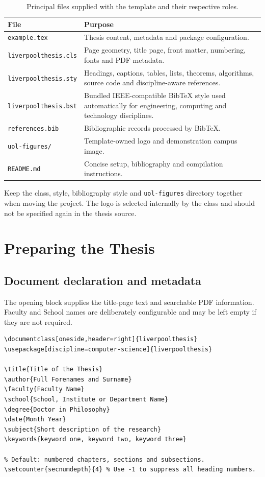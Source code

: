 \documentclass[oneside,header=auto]{liverpoolthesis}
\begin{document}
\begin{table}[htbp]
  \centering
  \caption[Principal template files]{Principal files supplied with the template and their respective roles.}
  \label{tab:files}
  \begin{tabular}{p{}p{}}
    \toprule
    \textbf{File} & \textbf{Purpose} \\
    \midrule
    \texttt{example.tex} & Thesis content, metadata and package configuration. \\
    \texttt{liverpoolthesis.cls} & Page geometry, title page, front matter,
      numbering, fonts and PDF metadata. \\
    \texttt{liverpoolthesis.sty} & Headings, captions, tables, lists,
      theorems, algorithms, source code and discipline-aware references. \\
    \texttt{liverpoolthesis.bst} & Bundled IEEE-compatible BibTeX style used
      automatically for engineering, computing and technology disciplines. \\
    \texttt{references.bib} & Bibliographic records processed by BibTeX. \\
    \texttt{uol-figures/} & Template-owned logo and demonstration campus image. \\
    \texttt{README.md} & Concise setup, bibliography and compilation instructions. \\
    \bottomrule
  \end{tabular}
\end{table}

Keep the class, style, bibliography style and \texttt{uol-figures} directory together when moving the project. The logo is selected internally by the class and should not be specified again in the thesis source.

\chapter{Preparing the Thesis}

\section{Document declaration and metadata}

The opening block supplies the title-page text and searchable PDF information. Faculty and School names are deliberately configurable and may be left empty if they are not required.

\begin{lstlisting}[language={[LaTeX]TeX}]
\documentclass[oneside,header=right]{liverpoolthesis}
\usepackage[discipline=computer-science]{liverpoolthesis}

\title{Title of the Thesis}
\author{Full Forenames and Surname}
\faculty{Faculty Name}
\school{School, Institute or Department Name}
\degree{Doctor in Philosophy}
\date{Month Year}
\subject{Short description of the research}
\keywords{keyword one, keyword two, keyword three}

% Default: numbered chapters, sections and subsections.
\setcounter{secnumdepth}{4} % Use -1 to suppress all heading numbers.
\end{lstlisting}
\end{document}
